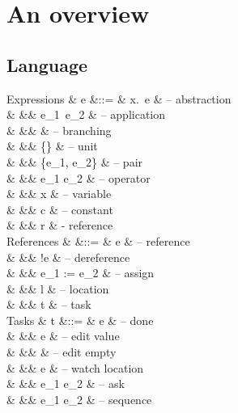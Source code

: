 
\newpage
\section{An overview}


\subsection{Language}

\begin{grammar}
  Expressions
    & e      &::= & \lambda x.\ e               & – abstraction \\
    &        &\mid& e_1\ e_2                    & – application \\
    &        &\mid&           & – branching \\
    &        &\mid& \{\}                        & – unit \\
    &        &\mid& \{e_1, e_2\}                & – pair \\
    &        &\mid& e_1 \star e_2               & – operator \\
    &        &\mid& x                           & – variable \\
    &        &\mid& c                           & – constant \\
    &        &\mid& r                           & - reference \\
  References
    &        &::= & \Ref e                      & – reference \\
    &        &\mid& !e                          & – dereference \\
    &        &\mid& e_1 := e_2                  & – assign \\
    &        &\mid& l                           & – location \\
    &        &\mid& t                           & – task \\
  Tasks
    & t      &::= & \Done e                     & – done \\
    &        &\mid& \Edit e                     & – edit value \\
    &        &\mid& \Empty \beta                & – edit empty \\
    &        &\mid& \Watch e                    & – watch location \\
    &        &\mid& e_1 \Then e_2               & – ask \\
    &        &\mid& e_1 \When e_2               & – sequence \\

\end{grammar}
